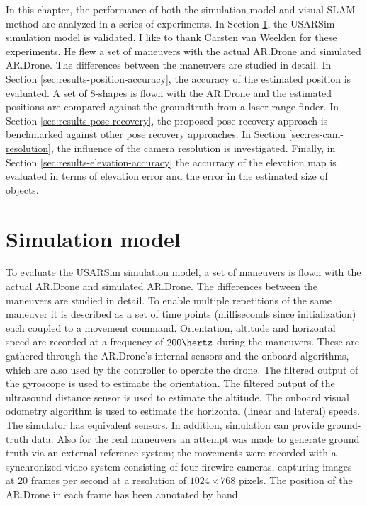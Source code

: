 In this chapter, the performance of both the simulation model and visual SLAM method are analyzed in a series of experiments.
In Section \ref{sec:simulation_results}, the USARSim simulation model is validated.
I like to thank Carsten van Weelden for these experiments.
He flew a set of maneuvers with the actual AR.Drone and simulated AR.Drone. The differences between the maneuvers are studied in detail.
In Section \ref{sec:results-position-accuracy}, the accuracy of the estimated position is evaluated.
A set of 8-shapes is flown with the AR.Drone and the estimated positions are compared against the groundtruth from a laser range finder.
In Section \ref{sec:results-pose-recovery}, the proposed pose recovery approach is benchmarked against other pose recovery approaches.
In Section \ref{sec:res-cam-resolution}, the influence of the camera resolution is investigated.
Finally, in Section \ref{sec:results-elevation-accuracy} the accurracy of the elevation map is evaluated in terms of elevation error and the error in the estimated size of objects.


	\section{Simulation model}
\label{sec:simulation_results}
To evaluate the USARSim simulation model,  
a set of maneuvers is flown with the actual AR.Drone and
simulated AR.Drone. The differences between the maneuvers are studied in detail. To enable multiple repetitions of the same maneuver it is
described as a set of time points (milliseconds since initialization) each coupled to a movement command.
Orientation, altitude and horizontal speed are recorded at a frequency of $200\hertz$ during the maneuvers. These are gathered through the AR.Drone's internal sensors and the onboard algorithms, which are
also used by the controller to operate the drone. The filtered output of the gyroscope is used
to estimate the orientation. The filtered output of the ultrasound distance sensor is used to estimate
the altitude. The onboard visual odometry algorithm is used to estimate the horizontal (linear
and lateral) speeds. The simulator has equivalent sensors. In addition, simulation can provide ground-truth data. 
Also for the real maneuvers an attempt was made to generate ground truth via an external reference system; the movements were recorded with a synchronized video system consisting of four firewire cameras, capturing images at 20 frames per second at a resolution of $1024 \times 768$ pixels. The position of the AR.Drone 
in each frame has been annotated by hand. 

